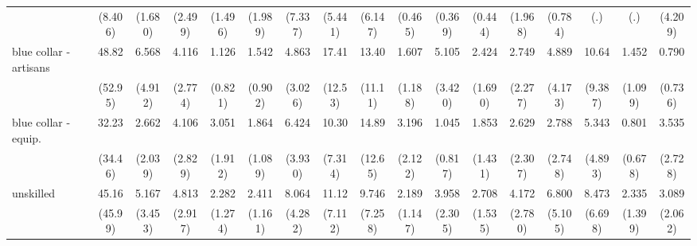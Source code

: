 {\begin{tabular}{l*{16}{c}}
                    &     (8.406)         &     (1.680)         &     (2.499)         &     (1.496)         &     (1.989)         &     (7.337)         &     (5.441)         &     (6.147)         &     (0.465)         &     (0.369)         &     (0.444)         &     (1.968)         &     (0.784)         &         (.)         &         (.)         &     (4.209)         \\
[1em]
blue collar - artisans&       48.82\sym{***}&       6.568\sym{*}  &       4.116\sym{*}  &       1.126         &       1.542         &       4.863\sym{*}  &       17.41\sym{***}&       13.40\sym{**} &       1.607         &       5.105\sym{*}  &       2.424         &       2.749         &       4.889         &       10.64\sym{**} &       1.452         &       0.790         \\
                    &     (52.95)         &     (4.912)         &     (2.774)         &     (0.821)         &     (0.902)         &     (3.026)         &     (12.53)         &     (11.11)         &     (1.188)         &     (3.420)         &     (1.690)         &     (2.277)         &     (4.173)         &     (9.387)         &     (1.099)         &     (0.736)         \\
[1em]
blue collar - equip.&       32.23\sym{**} &       2.662         &       4.106\sym{*}  &       3.051         &       1.864         &       6.424\sym{**} &       10.30\sym{**} &       14.89\sym{**} &       3.196         &       1.045         &       1.853         &       2.629         &       2.788         &       5.343         &       0.801         &       3.535         \\
                    &     (34.46)         &     (2.039)         &     (2.829)         &     (1.912)         &     (1.089)         &     (3.930)         &     (7.314)         &     (12.65)         &     (2.122)         &     (0.817)         &     (1.431)         &     (2.307)         &     (2.748)         &     (4.893)         &     (0.678)         &     (2.728)         \\
[1em]
unskilled           &       45.16\sym{***}&       5.167\sym{*}  &       4.813\sym{**} &       2.282         &       2.411         &       8.064\sym{***}&       11.12\sym{***}&       9.746\sym{**} &       2.189         &       3.958\sym{*}  &       2.708         &       4.172\sym{*}  &       6.800\sym{*}  &       8.473\sym{**} &       2.335         &       3.089         \\
                    &     (45.99)         &     (3.453)         &     (2.917)         &     (1.274)         &     (1.161)         &     (4.282)         &     (7.112)         &     (7.258)         &     (1.147)         &     (2.305)         &     (1.535)         &     (2.780)         &     (5.105)         &     (6.698)         &     (1.399)         &     (2.062)         \\

\end{tabular}}

